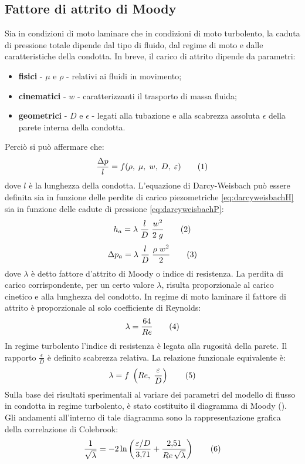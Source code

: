 \subsection{Fattore di attrito di Moody}
Sia in condizioni di moto laminare che in condizioni di moto turbolento, la caduta di pressione totale dipende dal tipo di fluido, dal regime di moto e dalle caratteristiche della condotta. In breve, il carico di attrito dipende da parametri:
\begin{itemize}
    \item \textbf{fisici} - \(\mu\) e \(\rho\) - relativi ai fluidi in movimento;
    \item \textbf{cinematici} - \(w\) - caratterizzanti il trasporto di massa fluida;
    \item \textbf{geometrici} - \(D\) e \(\epsilon\) - legati alla tubazione e alla scabrezza assoluta \(\epsilon\) della parete interna della condotta.
\end{itemize}
Perciò si può affermare che:
\[\frac{\Delta p}{l}=f(\rho, \; \mu, \; w, \; D, \; \epsilon) \addtag \label{eq:funzcaduta} \]
dove \(l\) è la lunghezza della condotta. L'equazione di Darcy-Weisbach può essere definita sia in funzione delle perdite di carico piezometriche \eqref{eq:darcyweisbachH} sia in funzione delle cadute di pressione \eqref{eq:darcyweisbachP}:
\[h_a = \lambda \; \frac{l}{D} \; \frac{w^2}{2 \; g} \addtag \label{eq:darcyweisbachH} \]
\[\Delta p_a = \lambda \; \frac{l}{D} \; \frac{\rho \; w^2}{2} \addtag \label{eq:darcyweisbachP} \]
dove \(\lambda\) è detto fattore d'attrito di Moody o indice di resistenza. La perdita di carico corrispondente, per un certo valore \(\lambda\), risulta proporzionale al carico cinetico e alla lunghezza del condotto. In regime di moto laminare il fattore di attrito è proporzionale al solo coefficiente di Reynolds:
\[\lambda=\frac{64}{Re} \addtag \]
In regime turbolento l'indice di resistenza è legata alla rugosità della parete. Il rapporto \(\frac{\epsilon}{D}\) è definito scabrezza relativa. La relazione funzionale equivalente è:
\[\lambda=f \; \left(Re, \; \frac{\epsilon}{D}\right) \addtag \]
Sulla base dei risultati sperimentali al variare dei parametri del modello di flusso in condotta in regime turbolento, è stato costituito il diagramma di Moody (). Gli andamenti all'interno di tale diagramma sono la rappresentazione grafica della correlazione di Colebrook:
\[ \frac{1}{\sqrt{\lambda}} = - 2 \ln \left( \frac { \epsilon/D} {3{,}71} + \frac {2{,}51} {Re \, \sqrt{\lambda}} \right) \addtag \label{eq:colebrook} \]


